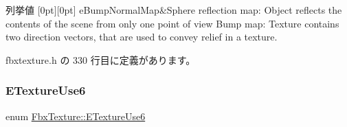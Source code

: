 \begin{DoxyEnumFields}{列挙値}
[0pt][0pt]{}\mbox{\label{class_fbx_texture_af034d10e711237dd9ae92a5965787f25a7131fd3111db906c4242f2009191344e}} 
e\+Bump\+Normal\+Map&Sphere reflection map\+: Object reflects the contents of the scene from only one point of view Bump map\+: Texture contains two direction vectors, that are used to convey relief in a texture. \\
\hline

\end{DoxyEnumFields}


 fbxtexture.\+h の 330 行目に定義があります。

\mbox{\label{class_fbx_texture_a321c489f8a8a5294298ffbf0ed361db9}} 
\subsubsection{\texorpdfstring{E\+Texture\+Use6}{ETextureUse6}}
{\footnotesize\ttfamily enum \hyperlink{class_fbx_texture_a321c489f8a8a5294298ffbf0ed361db9}{Fbx\+Texture\+::\+E\+Texture\+Use6}}

